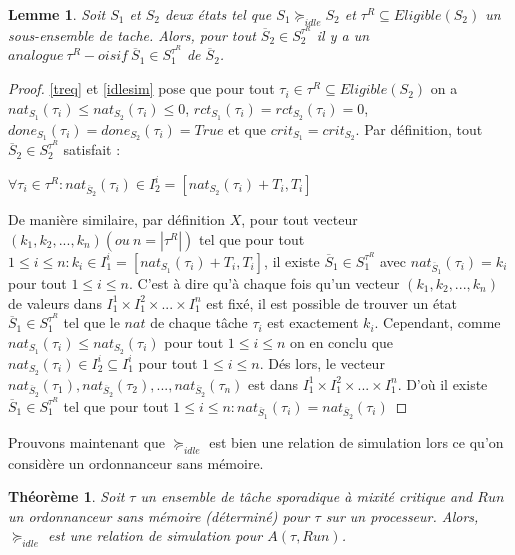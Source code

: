 \documentclass[a4paper]{report}
\theoremstyle{break}
\theoremstyle{breakplain}
\newtheorem{theo}{Théorème}
\newtheorem{lem}{Lemme}
\begin{document}
\begin{lem}
\label{reqanalogueeq}
Soit $S_1$ et $S_2$ deux états tel que $S_1 \succeq_{idle} S_2$ et $\tau^R \subseteq Eligible(S_2)$ un sous-ensemble de tache. Alors, pour tout $\overline{S}_2 \in S_2^{\tau^R}$ il y a un $analogue\ \tau^R-oisif\ \overline{S}_1 \in S_1^{\tau^R}$ de $\overline{S}_2$.
\end{lem}
\begin{proof}
\autoref{treq} et \autoref{idlesim} pose que pour tout $\tau_i \in \tau^R \subseteq Eligible(S_2)$ on a $nat_{S_1}(\tau_i) \leq nat_{S_2}(\tau_i) \leq 0$, $rct_{S_1}(\tau_i) = rct_{S_2}(\tau_i) = 0$, $done_{S_1}(\tau_i) = done_{S_2}(\tau_i) = True$ et que $crit_{S_1} = crit_{S_2}$. Par définition, tout $\overline{S}_2 \in S^{\tau^R}_2$ satisfait :
\begin{center}
$\forall \tau_i \in \tau^R : nat_{\overline{S}_2}(\tau_i) \in I^i_2=[nat_{S_2}(\tau_i)+T_i, T_i] $
\end{center}
De manière similaire, par définition $X$, pour tout vecteur $(k_1, k_2, ..., k_n)(ou\ n = |\tau^R|)$ tel que pour tout $1\leq i \leq n: k_i \in I^i_1=[nat_{S_1}(\tau_i)+T_i, T_i]$, il existe $\overline{S}_1\in S^{\tau^R}_1$ avec $nat_{\overline{S}_1}(\tau_i) = k_i$ pour tout $1\leq i \leq n$. C'est à dire qu'à chaque fois qu'un vecteur $(k_1, k_2, ..., k_n)$ de valeurs dans $I_1^1 \times I_1^2 \times ... \times I_1^n$ est fixé, il est possible de trouver un état $\overline{S}_1 \in S^{\tau^R}_1$ tel que le $nat$ de chaque tâche $\tau_i$ est exactement $k_i$. Cependant, comme $nat_{S_1}(\tau_i) \leq nat_{S_2}(\tau_i)$ pour tout $1\leq i \leq n$ on en conclu que $nat_{S_2}(\tau_i) \in I^i_2 \subseteq I^i_1$ pour tout $1\leq i \leq n$. Dés lors, le vecteur $nat_{\overline{S}_2}(\tau_1), nat_{\overline{S}_2}(\tau_2), ..., nat_{\overline{S}_2}(\tau_n)$ est dans $I_1^1 \times I_1^2 \times ... \times I_1^n$. D'où il existe $\overline{S}_1 \in S^{\tau^R}_1$ tel que pour tout $1\leq i \leq n : nat_{\overline{S}_1}(\tau_i) = nat_{\overline{S}_2}(\tau_i)$
\end{proof}


Prouvons maintenant que $\succeq_{idle}$ est bien une relation de simulation lors ce qu'on considère un ordonnanceur sans mémoire.

\begin{theo}
Soit $\tau$ un ensemble de tâche sporadique à mixité critique and $Run$ un ordonnanceur sans mémoire (déterminé) pour $\tau$ sur un processeur. Alors, $\succeq_{idle}$ est une relation de simulation pour $A(\tau, Run)$.
\end{theo}
\end{document}
